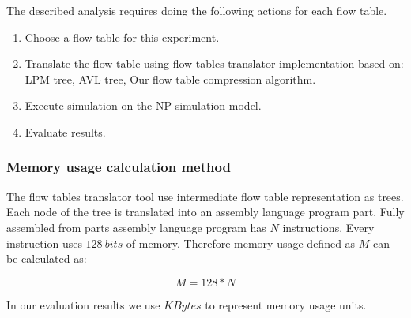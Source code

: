 \documentclass[conference]{IEEEtran}
\begin{document}
        The described analysis requires doing the following actions for each flow table.

        \begin{enumerate}
            \item Choose a flow table for this experiment.
            \item Translate the flow table using flow tables translator implementation based on:
                LPM tree, AVL tree, Our flow table compression algorithm.
            \item Execute simulation on the NP simulation model.
            \item Evaluate results.
        \end{enumerate}
        \subsubsection{Memory usage calculation method}
            The flow tables translator tool use intermediate flow table representation as trees.
            Each node of the tree is translated into an assembly language program part.
            Fully assembled from parts assembly language program has \(N\) instructions.
            Every instruction uses \(128~bits\) of memory. Therefore memory usage defined as \(M\)
            can be calculated as:
            
            \[M = 128 * N\]

            In our evaluation results we use \(KBytes\) to represent memory usage units. 
\end{document}
